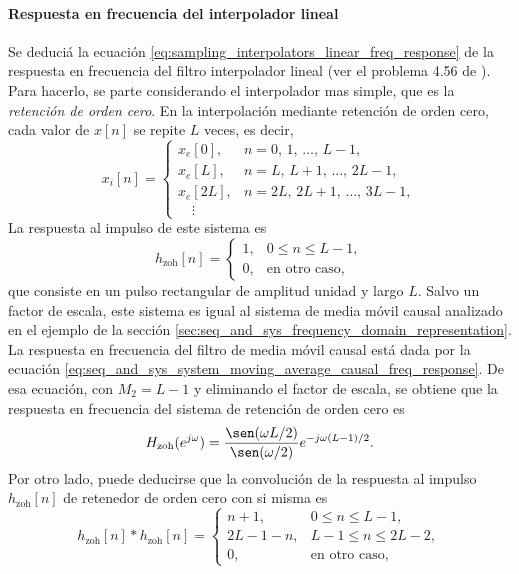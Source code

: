 \documentclass[a4paper]{report}
\begin{document}
\paragraph{Respuesta en frecuencia del interpolador lineal} Se deduciá la ecuación \ref{eq:sampling_interpolators_linear_freq_response} de la respuesta en frecuencia del filtro interpolador lineal (ver el problema 4.56 de \cite{oppenheim2009discrete}). Para hacerlo, se parte considerando el interpolador mas simple, que es la \emph{retención de orden cero}. En la interpolación mediante retención de orden cero, cada valor de \(x[n]\) se repite \(L\) veces, es decir,
\[
 x_i[n]=
 \left\{ 
  \begin{array}{ll}
   x_e[0], & n=0,\,1,\,\dots,\,L-1,\\
   x_e[L], & n=L,\,L+1,\,\dots,\,2L-1,\\
   x_e[2L], & n=2L,\,2L+1,\,\dots,\,3L-1,\\
   \quad\vdots
  \end{array}
 \right.
\]
La respuesta al impulso de este sistema es
\begin{equation}\label{eq:sampling_interpolators_zoh_impulse_response}
 h_\textrm{zoh}[n]=
 \left\{ 
 \begin{array}{ll}
  1, & 0\leq n\leq L-1,\\
  0, & \textrm{en otro caso,}
 \end{array}
 \right. 
\end{equation}
que consiste en un pulso rectangular de amplitud unidad y largo \(L\). Salvo un factor de escala, este sistema es igual al sistema de media móvil causal analizado en el ejemplo de la sección \ref{sec:seq_and_sys_frequency_domain_representation}. La respuesta en frecuencia del filtro de media móvil causal está dada por la ecuación \ref{eq:seq_and_sys_system_moving_average_causal_freq_response}. De esa ecuación, con \(M_2=L-1\) y eliminando el factor de escala, se obtiene que la respuesta en frecuencia del sistema de retención de orden cero es
\begin{equation}\label{eq:sampling_interpolators_zoh_freq_response}
 H_\textrm{zoh}(e^{j\omega})=\frac{\sen(\omega L/2)}{\sen(\omega/2)}e^{-j\omega (L-1)/2}.  
\end{equation}
Por otro lado, puede deducirse que la convolución de la respuesta al impulso \(h_\textrm{zoh}[n]\) de retenedor de orden cero con si misma es
\[
 h_\textrm{zoh}[n]*h_\textrm{zoh}[n]=
 \left\{ 
 \begin{array}{ll}
  n+1, & 0\leq n\leq L-1,\\
  2L-1-n, & L-1\leq n\leq 2L-2,\\
  0, & \textrm{en otro caso,}
 \end{array}
 \right. 
\]
\end{document}
